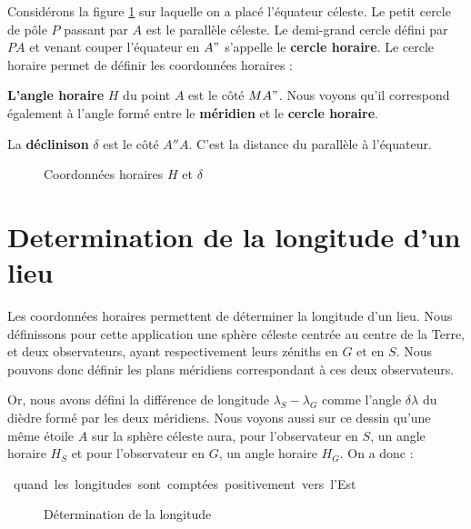 \documentclass[12pt]{report}
\begin{document}
Considérons la figure \ref{fig:16} sur laquelle on a placé l'équateur céleste. Le petit cercle de pôle $P$ passant par $A$ est le parallèle céleste. Le demi-grand cercle défini par $PA$ et venant couper l'équateur en $A"$ s'appelle le \textbf{cercle horaire}. Le cercle horaire permet de définir les coordonnées horaires :

\textbf{L'angle horaire } $H$ du point $A$ est le côté $MA"$. Nous voyons qu'il correspond également à l'angle formé entre le \textbf{méridien} et le \textbf{cercle horaire}.

La \textbf{déclinison} $\delta$ est le côté $A''A$. C'est la distance du parallèle à l'équateur.



\begin{figure}[ht]
\begin{center}
\end{center}
\caption{Coordonnées horaires $H$ et $\delta$}
\label{fig:16}
\end{figure}


\section{Determination de la longitude d'un lieu}

Les coordonnées horaires permettent de déterminer la longitude d'un lieu. Nous définissons pour cette application une sphère céleste centrée au centre de la Terre, et deux observateurs, ayant respectivement leurs zéniths en $G$ et en $S$. Nous pouvons donc définir les plans méridiens correspondant à ces deux observateurs.

Or, nous avons défini la différence de longitude $\lambda_S - \lambda_G$ comme l'angle $\delta \lambda$ du dièdre formé par les deux méridiens.  Nous voyons aussi sur ce dessin qu'une même étoile $A$ sur la sphère céleste aura, pour l'observateur en $S$, un angle horaire $H_S$ et pour l'observateur en $G$, un angle horaire $H_G$. On a donc :

\begin{center}
 \ \mbox{quand les longitudes sont comptées positivement vers l'Est}
\end{center}
\bigskip


\begin{figure}[ht]
\begin{center}
\end{center}
\caption{Détermination de la longitude}
\label{fig:17}
\end{figure}
\end{document}
